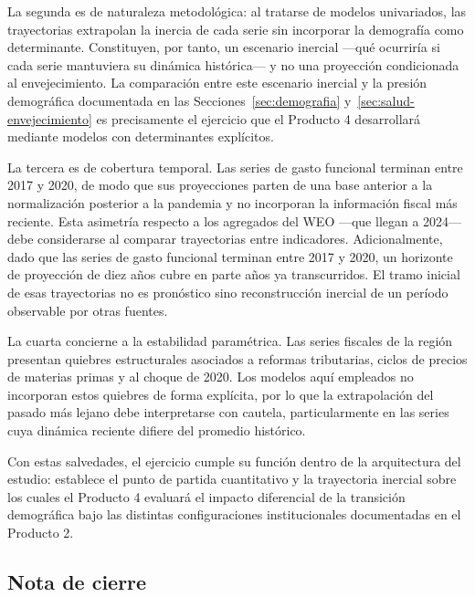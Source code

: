 \documentclass[12pt, letterpaper]{article}
\begin{document}
La segunda es de naturaleza metodológica: al tratarse de modelos univariados, las
trayectorias extrapolan la inercia de cada serie sin incorporar la demografía como
determinante. Constituyen, por tanto, un escenario inercial —qué ocurriría si cada
serie mantuviera su dinámica histórica— y no una proyección condicionada al
envejecimiento. La comparación entre este escenario inercial y la presión
demográfica documentada en las Secciones~\ref{sec:demografia}
y~\ref{sec:salud-envejecimiento} es precisamente el ejercicio que el Producto 4
desarrollará mediante modelos con determinantes explícitos.

La tercera es de cobertura temporal. Las series de gasto funcional terminan entre 2017
y 2020, de modo que sus proyecciones parten de una base anterior a la normalización
posterior a la pandemia y no incorporan la información fiscal más reciente. Esta
asimetría respecto a los agregados del WEO —que llegan a 2024— debe considerarse al
comparar trayectorias entre indicadores. Adicionalmente, dado que las series de
gasto funcional terminan entre 2017 y 2020, un horizonte de proyección de diez años
cubre en parte años ya transcurridos. El tramo inicial de esas trayectorias no es
pronóstico sino reconstrucción inercial de un período observable por otras fuentes.

La cuarta concierne a la estabilidad paramétrica. Las series fiscales de la región presentan quiebres estructurales asociados a reformas tributarias, ciclos de precios de
materias primas y al choque de 2020. Los modelos aquí empleados no incorporan estos quiebres de forma explícita, por lo que la extrapolación del pasado más lejano debe
interpretarse con cautela, particularmente en las series cuya dinámica reciente difiere del promedio histórico.

Con estas salvedades, el ejercicio cumple su función dentro de la arquitectura del estudio: establece el punto de partida cuantitativo y la trayectoria inercial sobre los
cuales el Producto 4 evaluará el impacto diferencial de la transición demográfica bajo
las distintas configuraciones institucionales documentadas en el Producto 2.







\subsection*{Nota de cierre}
\end{document}
